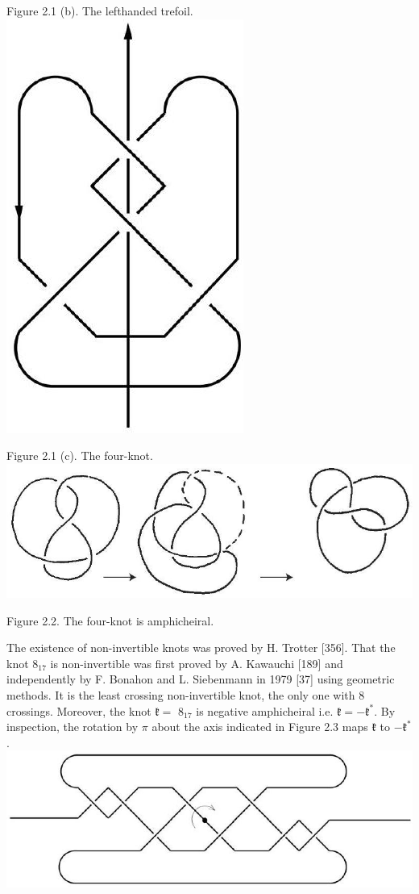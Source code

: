 \documentclass[10pt, letterpaper]{article}
\begin{document}
Figure 2.1 (b). The lefthanded trefoil.\\
\includegraphics[scale=0.2, center]{2025_05_21_9c06be8de7a55410f8c1g-030(1)}

Figure 2.1 (c). The four-knot.\\
\includegraphics[scale=0.2, center]{2025_05_21_9c06be8de7a55410f8c1g-031(1)}

Figure 2.2. The four-knot is amphicheiral.

The existence of non-invertible knots was proved by H. Trotter [356]. That the knot $8_{17}$ is non-invertible was first proved by A. Kawauchi [189] and independently by F. Bonahon and L. Siebenmann in 1979 [37] using geometric methods. It is the least crossing non-invertible knot, the only one with 8 crossings. Moreover, the knot $\mathfrak{k}=$ $8_{17}$ is negative amphicheiral i.e. $\mathfrak{k}=-\mathfrak{k}^{*}$. By inspection, the rotation by $\pi$ about the axis indicated in Figure 2.3 maps $\mathfrak{k}$ to $-\mathfrak{k}^{*}$.\\
\includegraphics[scale=0.2, center]{2025_05_21_9c06be8de7a55410f8c1g-031}
\end{document}
